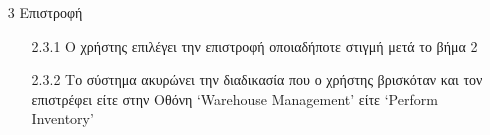 \documentclass[12pt,a4paper,twoside]{book}
\begin{document}
\begin{enumerate}
\begin{enumerate}
        \end{enumerate}
  \item[3 ] Επιστροφή
        \begin{enumerate}
          \item[2.3.1 ] Ο χρήστης επιλέγει την επιστροφή οποιαδήποτε στιγμή μετά το βήμα 2 %
          \item[2.3.2 ] Το σύστημα ακυρώνει την διαδικασία που ο χρήστης βρισκόταν και τον επιστρέφει είτε στην Οθόνη `Warehouse Management' είτε `Perform Inventory' %
        \end{enumerate}
\end{enumerate}
\end{document}
